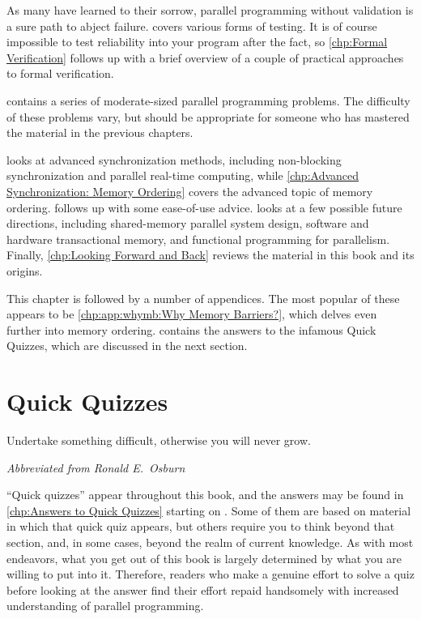 As many have learned to their sorrow, parallel programming without
validation is a sure path to abject failure.
 covers various forms of testing.
It is of course impossible to test reliability into your program
after the fact, so \cref{chp:Formal Verification}
follows up with a brief overview of a couple of practical approaches to
formal verification.

contains a series of moderate-sized parallel programming problems.
The difficulty of these problems vary, but should be appropriate for
someone who has mastered the material in the previous chapters.

looks at advanced synchronization methods, including
non-blocking synchronization and parallel real-time computing,
while \cref{chp:Advanced Synchronization: Memory Ordering}
covers the advanced topic of memory ordering.
 follows up with some ease-of-use advice.
looks at a few possible future directions, including
shared-memory parallel system design, software and hardware transactional
memory, and functional programming for parallelism.
Finally, \cref{chp:Looking Forward and Back} reviews the material in
this book and its origins.

This chapter is followed by a number of appendices.
The most popular of these appears to be
\cref{chp:app:whymb:Why Memory Barriers?},
which delves even further into memory ordering.
contains the answers to the infamous Quick Quizzes, which are discussed in
the next section.

\section{Quick Quizzes}
\label{sec:howto:Quick Quizzes}
%
\epigraph{Undertake something difficult, otherwise you will never grow.}
	 {\emph{Abbreviated from Ronald E.~Osburn}}

``Quick quizzes'' appear throughout this book, and the answers may
be found in
\cref{chp:Answers to Quick Quizzes} starting on
.
Some of them are based on material in which that quick quiz
appears, but others require you to think beyond that section, and,
in some cases, beyond the realm of current knowledge.
As with most endeavors, what you get out of this book is largely
determined by what you are willing to put into it.
Therefore, readers who make a genuine effort to solve a quiz before
looking at the answer
find their effort repaid handsomely with increased understanding
of parallel programming.

